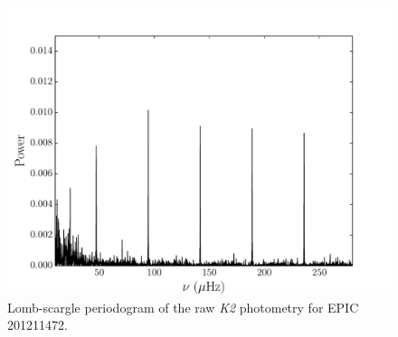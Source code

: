 \documentclass[useAMS, usenatbib]{aastex}
\begin{document}
\begin{figure}
\begin{center}
\includegraphics[width=6in, clip=true]{raw_201211472.pdf}
\caption{Lomb-scargle periodogram of the raw {\it K2} photometry for
	EPIC 201211472.}
\label{fig:raw}
\end{center}
\end{figure}
\end{document}
